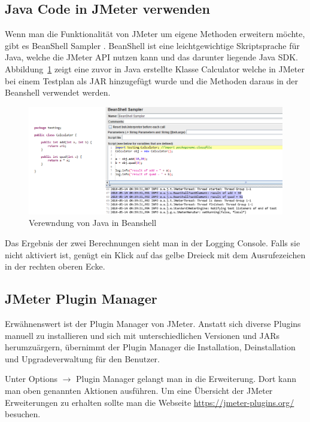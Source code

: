 \documentclass[a4paper,12pt]{article}
\begin{document}
\subsection{Java Code in JMeter verwenden}
Wenn man die Funktionalität von JMeter um eigene Methoden erweitern möchte, gibt es BeanShell Sampler \cite{online:beanshell}. BeanShell ist eine leichtgewichtige Skriptsprache für Java, welche die JMeter API nutzen kann und das darunter liegende Java SDK. Abbildung~\ref{fig:beanshell} zeigt eine zuvor in Java erstellte Klasse Calculator welche in JMeter bei einem Testplan als JAR hinzugefügt wurde und die Methoden daraus in der Beanshell verwendet werden.

\begin{figure}[htb]%
 \centering
    \includegraphics[width=1\textwidth]{bilder/beanshell.png}
  \caption{Verewndung von Java in Beanshell}
  \label{fig:beanshell}
\end{figure}

Das Ergebnis der zwei Berechnungen sieht man in der Logging Console. Falls sie nicht aktiviert ist, genügt ein Klick auf das gelbe Dreieck mit dem Ausrufezeichen in der rechten oberen Ecke.

\subsection{JMeter Plugin Manager}
Erwähnenswert ist der Plugin Manager von JMeter. Anstatt sich diverse Plugins manuell zu installieren und sich mit unterschiedlichen Versionen und JARs herumzuärgern, übernimmt der Plugin Manager die Installation, Deinstallation und Upgradeverwaltung für den Benutzer. \cite{online:jmeter}

Unter Options $\rightarrow$ Plugin Manager gelangt man in die Erweiterung. Dort kann man oben genannten Aktionen ausführen. Um eine Übersicht der JMeter Erweiterungen zu erhalten sollte man die Webseite \url{https://jmeter-plugins.org/} besuchen.
\end{document}
